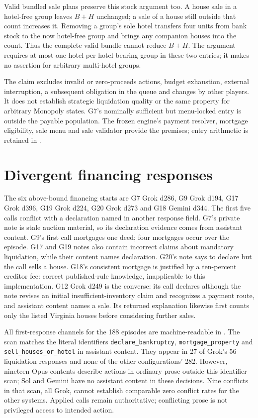 Valid bundled sale plans preserve this stock argument too. A house sale in a hotel-free group leaves $B+H$ unchanged; a sale of a house still outside that count increases it. Removing a group's sole hotel transfers four units from bank stock to the now hotel-free group and brings any companion houses into the count. Thus the complete valid bundle cannot reduce $B+H$. The argument requires at most one hotel per hotel-bearing group in these two entries; it makes no assertion for arbitrary multi-hotel groups.

The claim excludes invalid or zero-proceeds actions, budget exhaustion, external interruption, a subsequent obligation in the queue and changes by other players. It does not establish strategic liquidation quality or the same property for arbitrary Monopoly states. G7's nominally sufficient but menu-locked entry is outside the payable population. The frozen engine's payment resolver, mortgage eligibility, sale menu and sale validator provide the premises; entry arithmetic is retained in .

\section{Divergent financing responses}
\label{app:divergences}
The six above-bound financing starts are G7 Grok d286, G9 Grok d194, G17 Grok d396, G19 Grok d224, G20 Grok d273 and G18 Gemini d344. The first five calls conflict with a declaration named in another response field. G7's private note is stale auction material, so its declaration evidence comes from assistant content. G9's first call mortgages one deed; four mortgages occur over the episode. G17 and G19 notes also contain incorrect claims about mandatory liquidation, while their content names declaration. G20's note says to declare but the call sells a house. G18's consistent mortgage is justified by a ten-percent creditor fee: correct published-rule knowledge, inapplicable to this implementation. G12 Grok d249 is the converse: its call declares although the note revises an initial insufficient-inventory claim and recognizes a payment route, and assistant content names a sale. Its returned explanation likewise first counts only the listed Virginia houses before considering further sales.

All first-response channels for the 188 episodes are machine-readable in . The scan matches the literal identifiers \texttt{declare\_bankruptcy}, \texttt{mortgage\_property} and \texttt{sell\_houses\_or\_hotel} in assistant content. They appear in 27 of Grok's 56 liquidation responses and none of the other configurations' 282. However, nineteen Opus contents describe actions in ordinary prose outside this identifier scan; Sol and Gemini have no assistant content in these decisions. Nine conflicts in that scan, all Grok, cannot establish comparable zero conflict rates for the other systems. Applied calls remain authoritative; conflicting prose is not privileged access to intended action.

